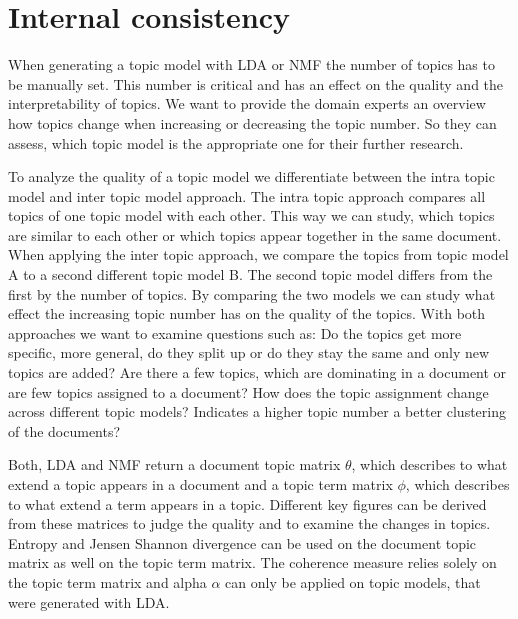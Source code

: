 \newpage
\section{Internal consistency}
\label{Internal_consistency}

%
When generating a topic model with \ac{LDA} or \ac{NMF} the number of topics has to be manually set. This number is critical and has an effect on the quality and the interpretability of topics. We want to provide the domain experts an overview how topics change when increasing or decreasing the topic number. So they can assess, which topic model is the appropriate one for their further research. 

%

To analyze the quality of a topic model we differentiate between the intra topic model and inter topic model approach. The intra topic approach compares all topics of one topic model with each other. This way we can study, which topics are similar to each other or which topics appear together in the same document. When applying the inter topic approach, we compare the topics from topic model A to a second different topic model B. The second topic model differs from the first by the number of topics. By comparing the two models we can study what effect the increasing topic number has on the quality of the topics. With both approaches we want to examine questions such as: Do the topics get more specific, more general, do they split up or do they stay the same and only new topics are added? Are there a few topics, which are dominating in a document or are few topics assigned to a document? How does the topic assignment change across different topic models? Indicates a higher topic number a better clustering of the documents?

Both, \ac{LDA} and \ac{NMF} return a document topic matrix $\theta$, which describes to what extend a topic appears in a document and a topic term matrix $\phi$, which describes to what extend a term appears in a topic. Different key figures can be derived from these matrices to judge the quality and to examine the changes in topics.
Entropy and Jensen Shannon divergence can be used on the document topic matrix as well on the topic term matrix. The coherence measure relies solely on the topic term matrix and alpha $\alpha$  can only be applied on topic models, that were generated with \ac{LDA}.

